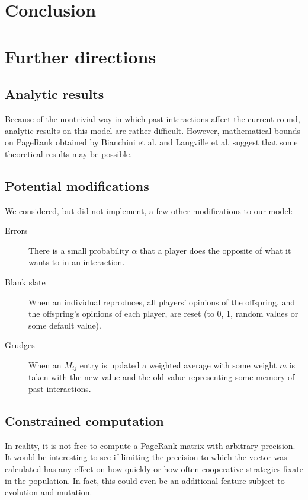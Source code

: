 \documentclass{amsart}
\begin{document}
\section{Conclusion}
\label{sec:conclusion}

\section{Further directions}

\subsection{Analytic results}

Because of the nontrivial way in which past interactions affect the
current round, analytic results on this model are rather
difficult. However, mathematical bounds on PageRank obtained by
Bianchini et al. \cite{bianchini_Inside_2005} and Langville et
al. \cite{langville_deeper_2004} suggest that some theoretical results
may be possible.

\subsection{Potential modifications}

We considered, but did not implement, a few other modifications to our
model:
\begin{description}
\item[Errors] There is a small probability $\alpha$ that a player does
  the opposite of what it wants to in an interaction.
\item[Blank slate] When an individual reproduces, all players'
  opinions of the offspring, and the offspring's opinions of each
  player, are reset (to 0, 1, random values or some default value).
\item[Grudges] When an $M_{ij}$ entry is updated a weighted average
  with some weight $m$ is taken with the new value and the old value
  representing some memory of past interactions.
\end{description}

\subsection{Constrained computation}

In reality, it is not free to compute a PageRank matrix with arbitrary
precision. It would be interesting to see if limiting the precision to
which the vector was calculated has any effect on how quickly or how
often cooperative strategies fixate in the population. In fact, this
could even be an additional feature subject to evolution and mutation.
\end{document}
